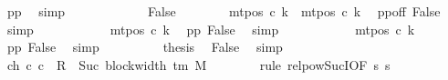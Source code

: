 \begin{isabellebody}
\ pp{}\ \isamarkupfalse%
\ simp\isanewline
\ \ \ \ \isamarkupfalse%
\isanewline
\ \ \ \ \ \ \isamarkupfalse%
\ False\isanewline
\ \ \ \ \ \ \isamarkupfalse%
\ {\isachardoublequoteopen}mt{\isacharunderscore}{\kern0pt}pos\ c{}\ k{\isacharprime}{\kern0pt}\ {\isacharequal}{\kern0pt}\ mt{\isacharunderscore}{\kern0pt}pos\ c{}\ k{\isacharprime}{\kern0pt}{\isachardoublequoteclose}\ \isamarkupfalse%
\ pp{}off\ False\ \isamarkupfalse%
\ simp\isanewline
\ \ \ \ \ \ \isamarkupfalse%
\ \isamarkupfalse%
\ {\isachardoublequoteopen}{\isasymdots}\ {\isacharequal}{\kern0pt}\ mt{\isacharunderscore}{\kern0pt}pos\ c{}\ k{\isacharprime}{\kern0pt}{\isachardoublequoteclose}\ \isamarkupfalse%
\ pp{}\ False\ \isamarkupfalse%
\ simp\isanewline
\ \ \ \ \ \ \isamarkupfalse%
\ \isamarkupfalse%
\ {\isachardoublequoteopen}{\isasymdots}\ {\isacharequal}{\kern0pt}\ mt{\isacharunderscore}{\kern0pt}pos\ c{\isacharprime}{\kern0pt}\ k{\isacharprime}{\kern0pt}{\isachardoublequoteclose}\ \isamarkupfalse%
\ pp{}\ False\ \isamarkupfalse%
\ simp\isanewline
\ \ \ \ \ \ \isamarkupfalse%
\ \isamarkupfalse%
\ {\isacharquery}{\kern0pt}thesis\ \isamarkupfalse%
\ False\ \isamarkupfalse%
\ simp\isanewline
\ \ \ \ \isamarkupfalse%
\isanewline
\ \ \isamarkupfalse%
\isanewline
\ \ \isamarkupfalse%
\ ch{}{}{\isacharcolon}{\kern0pt}\ {\isachardoublequoteopen}{\isacharparenleft}{\kern0pt}c{}{\isacharcomma}{\kern0pt}\ c{}{\isacharparenright}{\kern0pt}\ {\isasymin}\ R{\isacharprime}{\kern0pt}\ {\isacharcircum}{\kern0pt}{\isacharcircum}{\kern0pt}\ Suc\ {\isacharparenleft}{\kern0pt}block{\isacharunderscore}{\kern0pt}width\ {\isacharparenleft}{\kern0pt}{\isasymGamma}{\isacharunderscore}{\kern0pt}tm\ M{\isacharparenright}{\kern0pt}\ {\isacharminus}{\kern0pt}\ {}{\isacharparenright}{\kern0pt}{\isachardoublequoteclose}\isanewline
\ \ \ \ \isamarkupfalse%
\ {\isacharparenleft}{\kern0pt}rule\ relpow{\isacharunderscore}{\kern0pt}Suc{\isacharunderscore}{\kern0pt}I{}{\isacharbrackleft}{\kern0pt}OF\ s{}\ s{}{\isacharbrackright}{\kern0pt}{\isacharparenright}{\kern0pt}\isanewline

\end{isabellebody}
